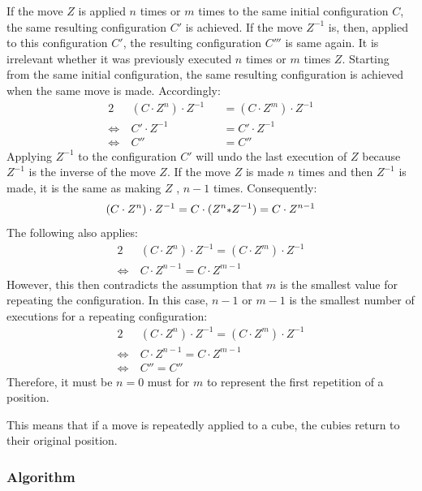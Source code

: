 \documentclass[12pt,a4paper]{article}
\theoremstyle{custom}
\begin{document}
If the move $Z$ is applied $n$ times or $m$ times to the same initial configuration $C$, the same resulting configuration $C'$ is achieved.
If the move $Z^{-1}$ is, then, applied to this configuration $C'$, the resulting configuration $C'''$ is  same again. It is irrelevant whether it was previously executed $n$ times or $m$ times $Z$. Starting from the same initial configuration, the same resulting configuration is achieved when the same move is made. Accordingly:
\begin{alignat*}{2}
\ &(C \cdot Z^n) \cdot Z^{-1} && = (C \cdot Z^m) \cdot Z^{-1} \\
\Leftrightarrow \ & C' \cdot Z^{-1} && = C' \cdot Z^{-1} \\
\Leftrightarrow \ & C'' && = C ''
\end{alignat*}
Applying $Z^{-1}$ to the configuration $C'$ will undo the last execution of $Z$ because $Z^{-1}$ is the inverse of the move $Z$. If the move $Z$ is made $n$ times and then $Z^{-1}$ is made, it is the same as making $Z$ , $n-1$ times. Consequently:
\begin{align*}
(C \cdot Z^n) \cdot Z^{-1}=C \cdot (Z^n \mathlarger{\scriptstyle*}  Z^{-1})=C \cdot Z^{n-1}
\end{align*}
The following also applies:
\begin{alignat*}{2}
 & (C \cdot Z^n) \cdot Z^{-1}  = (C \cdot Z^m) \cdot Z^{-1} \\
\Leftrightarrow \ & C \cdot Z^{n-1}  = C \cdot Z^{m-1}
\end{alignat*}
However, this then contradicts the assumption that $m$ is the smallest value for repeating the configuration. In this case, $n-1$ or $m-1$ is the smallest number of executions for a repeating configuration:
\begin{alignat*}{2}
 & (C \cdot Z^n) \cdot Z^{-1}  = (C \cdot Z^m) \cdot Z^{-1} \\
\Leftrightarrow \ & C \cdot Z^{n-1}  = C \cdot Z^{m-1} \\
\Leftrightarrow \ & C''  = C''
\end{alignat*}
Therefore, it must be $n=0$ must for $m$ to represent the first repetition of a position.

This means that if a move is repeatedly applied to a cube, the cubies return to their original position.

\subsubsection*{Algorithm}
\end{document}
